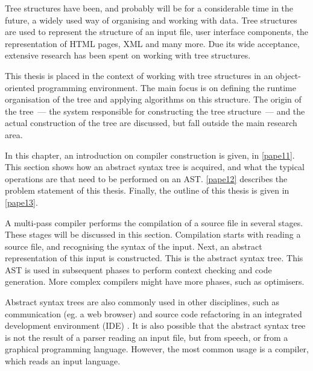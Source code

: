 \secdown

Tree structures have been, and probably will be for a considerable time in the
future, a widely used way of organising and working with data. Tree structures
are used to represent the structure of an input file, user interface components, the representation of HTML
pages, XML and many more. Due its wide
acceptance, extensive research has been spent on working with tree structures.

This thesis is placed in the context of working with tree structures in an
object-oriented programming environment. The main focus is on defining the
runtime organisation of the tree and applying algorithms on this structure. The
origin of the tree\ --- the system responsible for constructing the tree
structure\ --- and the actual construction of the tree are discussed, but fall
outside the main research area.

In this chapter, an introduction on compiler construction is given, in
\ref{pape11}. This section shows how an abstract syntax tree is acquired, and
what the typical operations are that need to be performed on an AST.
\ref{pape12} describes the problem statement of this thesis. Finally, the
outline of this thesis is given in \ref{pape13}.

\label{pape11}\secdown

A multi-pass compiler performs the compilation of a source file in several
stages. These stages will be discussed in this section. Compilation starts with
reading a source file, and recognising the syntax of the input. Next, an
abstract representation of this input is constructed. This is the abstract
syntax tree. This AST is used in subsequent phases to perform context checking
and code generation. More complex compilers might have more phases, such as
optimisers.

Abstract syntax trees are also commonly used in other disciplines, such as
communication (eg. a web browser) and source code refactoring in an integrated
development environment (IDE) \cite{Eclipse2007}. It is also possible that the
abstract syntax tree is not the result of a parser reading an input file, but
from speech, or from a graphical programming language. However, the most common
usage is a compiler, which reads an input language.


